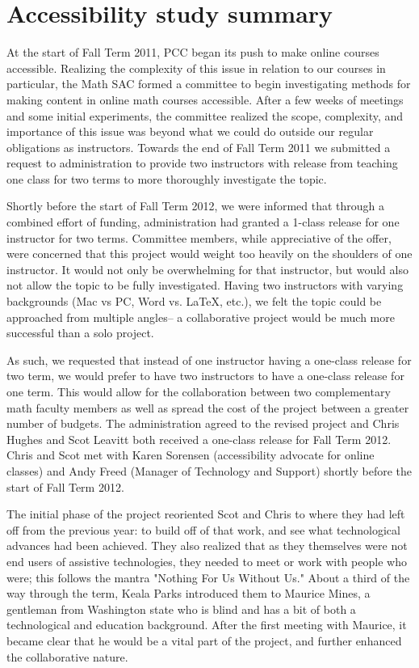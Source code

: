 \chapter{Accessibility study summary}\label{app:sec:accessibility}

At the start of Fall Term 2011, PCC began its push to make online courses accessible. 
Realizing the complexity of this issue in relation to our courses in particular, the Math SAC formed a
committee to begin investigating methods for making content in online math courses accessible. 
After a few weeks of meetings and some initial experiments, the committee realized the scope,
complexity, and importance of this issue was beyond what we could do outside our regular
obligations as instructors.  Towards the end of Fall Term 2011 we submitted a request to
administration to provide two instructors with release from teaching one class for two
terms to more thoroughly investigate the topic.

Shortly before the start of Fall Term 2012, we were informed that through a combined
effort of funding, administration had granted a 1-class release for one instructor for
two terms.  Committee members, while appreciative of the offer, were concerned that this
project would weight too heavily on the shoulders of one instructor.  It would not only be overwhelming for that
instructor, but would also not allow the topic to be fully investigated.  Having two
instructors with varying backgrounds (Mac vs PC, Word vs. LaTeX, etc.), we felt the
topic could be approached from multiple angles-- a collaborative project would
be much more successful than a solo project.

As such, we requested that instead of one instructor having a one-class release for two term, we would prefer to
have two instructors to have a one-class release for one term.  This would allow for the
collaboration between two complementary math faculty members as well as spread the cost of
the project between a greater number of budgets.  The administration agreed to the revised
project and Chris Hughes and Scot Leavitt both received a one-class release for Fall Term 2012. 
Chris and Scot met with Karen Sorensen (accessibility advocate for online classes) and Andy
Freed (Manager of Technology and Support) shortly before the start of Fall Term 2012.

The initial phase of the project reoriented Scot and Chris to where they had left off
from the previous year: to build off of that work, and see what technological advances
had been achieved. They also realized that as they themselves were not
end users of assistive technologies, they needed to meet or work with people who were; this
follows the mantra "Nothing For Us Without Us."  About a third of the way through the
term, Keala Parks introduced them to Maurice Mines, a gentleman from Washington state who is
blind and has a bit of both a technological and education background.  After the first
meeting with Maurice, it became clear that he would be a vital part of the project, and further enhanced
the collaborative nature.

